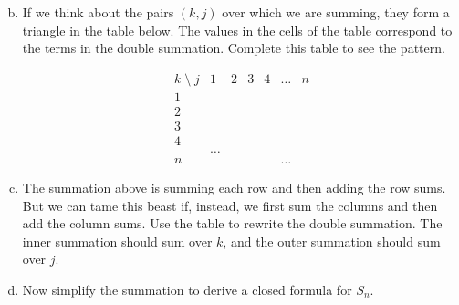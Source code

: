 \documentclass[12pt]{article}
\begin{document}
    \begin{enumerate}[(a)]
        \setcounter{enumi}{1}

    \item 
    If we think about the
  pairs $(k,j)$ over which we are summing, they form a triangle in the
  table below. The values in the cells of the table correspond to the
  terms in the double summation. Complete this table to see the pattern.

\[
\begin{array}{c|cccccc}
    k\; {\setminus} \;j &1&2&3&4&\dots&n\\
\hline
1& \\
2 &\\
3 \\
4 \\
 &\dots\\
n &&&&&\dots
\end{array}
\]


\item The summation above is summing each row and then adding the row
  sums.  But we can tame this beast if, instead, we first sum the
  columns and then add the column sums. Use the table to rewrite the
  double summation. The inner summation should sum over $k$, and the
  outer summation should sum over $j$.

\solution[\vspace{.5in}]{
\[ 
    S_n = \sum_{j=1}^n \sum_{k=j}^n 2^k.
\]
}

\item Now simplify the summation to derive a closed formula for $S_n$.


\end{enumerate}
\end{document}
